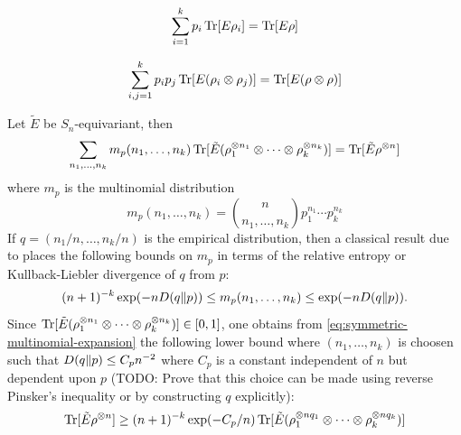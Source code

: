 \documentclass[notitlepage]{article}
\begin{document}
\begin{equation}
    \sum_{i=1}^{k}p_i\operatorname{Tr}[E \rho_i] = \operatorname{Tr}[E \rho]
\end{equation}

\begin{equation}
    \sum_{i,j=1}^{k}p_ip_j\operatorname{Tr}[E (\rho_i\otimes \rho_j)] = \operatorname{Tr}[E (\rho \otimes \rho)]
\end{equation}

Let $\tilde E$ be $S_n$-equivariant, then
\begin{equation}
    \label{eq:symmetric-multinomial-expansion}
    \sum_{n_1, \ldots, n_k} m_{p}(n_1, \ldots, n_k) \operatorname{Tr}[\tilde E (\rho_1^{\otimes n_1} \otimes \cdots \otimes \rho_k^{\otimes n_k}) ] = \operatorname{Tr}[\tilde E \rho^{\otimes n}]
\end{equation}
where $m_{p}$ is the multinomial distribution
\begin{equation}
    m_{p}(n_1, \ldots, n_k) = \binom{n}{n_1, \ldots, n_k} p_1^{n_1}\cdots p_{k}^{n_k}
\end{equation}
If $q = (n_1/n, \ldots, n_k/n)$ is the empirical distribution, then a classical result due to \cite{sanov1961probability,dembo2010large} places the following bounds on $m_{p}$ in terms of the relative entropy or Kullback-Liebler divergence \cite{kullback1997information} of $q$ from $p$:
\begin{equation}
    (n+1)^{-k} \exp(-n D\!\left(q\middle\|p\right)) \leq m_{p}(n_1, \ldots, n_k) \leq \exp(-n D\!\left(q\middle\|p\right)).
\end{equation}
Since $\operatorname{Tr}[\tilde E (\rho_1^{\otimes n_1} \otimes \cdots \otimes \rho_k^{\otimes n_k}) ] \in [0,1]$, one obtains from \cref{eq:symmetric-multinomial-expansion} the following lower bound where $(n_1, \ldots, n_k)$ is choosen such that $D\!\left(q\middle\|p\right) \leq C_p n^{-2}$ where $C_p$ is a constant independent of $n$ but dependent upon $p$ (TODO: Prove that this choice can be made using reverse Pinsker's inequality or by constructing $q$ explicitly):
\begin{equation}
    \operatorname{Tr}[\tilde E \rho^{\otimes n}] \geq (n+1)^{-k}\exp(-C_p/n)\operatorname{Tr}[\tilde E (\rho_1^{\otimes n q_1} \otimes \cdots \otimes \rho_k^{\otimes n q_k}) ]
\end{equation}
\end{document}
